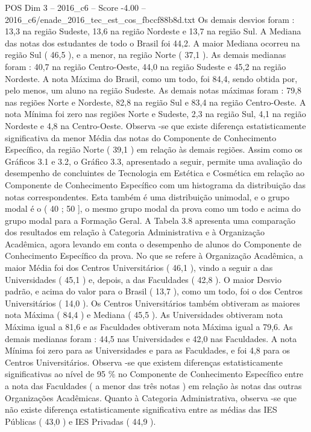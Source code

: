 \begin{textsample}{POS Dim 3 – 2016\_c6 – Score -4.00 – 2016\_c6/enade\_2016\_tec\_est\_cos\_fbccf88b8d.txt}
Os demais desvios foram : 13,3 na região Sudeste, 13,6 na região Nordeste e 13,7 na região Sul.
A Mediana das notas dos estudantes de todo o Brasil foi 44,2.
A maior Mediana ocorreu na região Sul ( 46,5 ), e a menor, na região Norte ( 37,1 ).
As demais medianas foram : 40,7 na região Centro-Oeste, 44,0 na região Sudeste e 45,2 na região Nordeste.
A nota Máxima do Brasil, como um todo, foi 84,4, sendo obtida por, pelo menos, um aluno na região Sudeste.
As demais notas máximas foram : 79,8 nas regiões Norte e Nordeste, 82,8 na região Sul e 83,4 na região Centro-Oeste.
A nota Mínima foi zero nas regiões Norte e Sudeste, 2,3 na região Sul, 4,1 na região Nordeste e 4,8 na Centro-Oeste.
Observa -se que existe diferença estatisticamente significativa da menor Média das notas do Componente de Conhecimento Específico, da região Norte ( 39,1 ) em relação às demais regiões.
Assim como os Gráficos 3.1 e 3.2, o Gráfico 3.3, apresentado a seguir, permite uma avaliação do desempenho de concluintes de Tecnologia em Estética e Cosmética em relação ao Componente de Conhecimento Específico com um histograma da distribuição das notas correspondentes.
Esta também é uma distribuição unimodal, e o grupo modal é o ( 40 ; 50 ], o mesmo grupo modal da prova como um todo e acima do grupo modal para a Formação Geral.
A Tabela 3.8 apresenta uma comparação dos resultados em relação à Categoria Administrativa e à Organização Acadêmica, agora levando em conta o desempenho de alunos do Componente de Conhecimento Específico da prova.
No que se refere à Organização Acadêmica, a maior Média foi dos Centros Universitários ( 46,1 ), vindo a seguir a das Universidades ( 45,1 ) e, depois, a das Faculdades ( 42,8 ).
O maior Desvio padrão, e acima do valor para o Brasil ( 13,7 ), como um todo, foi o dos Centros Universitários ( 14,0 ).
Os Centros Universitários também obtiveram as maiores nota Máxima ( 84,4 ) e Mediana ( 45,5 ).
As Universidades obtiveram nota Máxima igual a 81,6 e as Faculdades obtiveram nota Máxima igual a 79,6.
As demais medianas foram : 44,5 nas Universidades e 42,0 nas Faculdades.
A nota Mínima foi zero para as Universidades e para as Faculdades, e foi 4,8 para os Centros Universitários.
Observa -se que existem diferenças estatisticamente significativas ao nível de 95 \% no Componente de Conhecimento Específico entre a nota das Faculdades ( a menor das três notas ) em relação às notas das outras Organizações Acadêmicas.
Quanto à Categoria Administrativa, observa -se que não existe diferença estatisticamente significativa entre as médias das IES Públicas ( 43,0 ) e IES Privadas ( 44,9 ).

\end{textsample}
